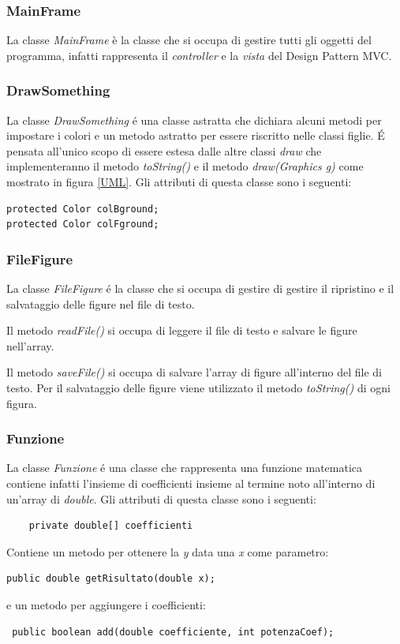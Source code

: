 \documentclass[a4paper,12pt,times,numbered,print,index]{article}
\begin{document}
\subsubsection{MainFrame} %
La classe \textit{MainFrame} è la classe che si occupa di gestire tutti gli oggetti del programma, infatti rappresenta il \textit{controller} e la \textit{vista} del Design Pattern MVC. 
\subsubsection{DrawSomething}
La classe \textit{DrawSomething} é una classe astratta che dichiara alcuni metodi per impostare i colori e un metodo astratto per essere riscritto nelle classi figlie.
É pensata all'unico scopo di essere estesa dalle altre classi \textit{draw} che implementeranno il metodo \textit{toString()} e il metodo \textit{draw(Graphics g)} come mostrato in figura \ref{UML}.
Gli attributi di questa classe sono i seguenti:
\begin{lstlisting}
protected Color colBground;
protected Color colFground;
\end{lstlisting}

\subsubsection{FileFigure}
La classe \textit{FileFigure} é la classe che si occupa di gestire di gestire il ripristino e il salvataggio delle figure nel file di testo.

Il metodo \textit{readFile()} si occupa di leggere il file di testo e salvare le figure nell'array.

Il metodo \textit{saveFile()} si occupa di salvare l'array di figure all'interno del file di testo. Per il salvataggio delle figure viene utilizzato il metodo \textit{toString()} di ogni figura.

\subsubsection{Funzione}
La classe \textit{Funzione} é una classe che rappresenta una funzione matematica contiene infatti l'insieme di coefficienti insieme al termine noto all'interno di un'array di \textit{double}.
Gli attributi di questa classe sono i seguenti:
\begin{lstlisting}
	private double[] coefficienti
\end{lstlisting}
Contiene un metodo per ottenere la \textit{y} data una \textit{x} come parametro:
\begin{lstlisting}
public double getRisultato(double x);
\end{lstlisting}
e un metodo per aggiungere i coefficienti:
\begin{lstlisting}
 public boolean add(double coefficiente, int potenzaCoef);
\end{lstlisting}
\end{document}
